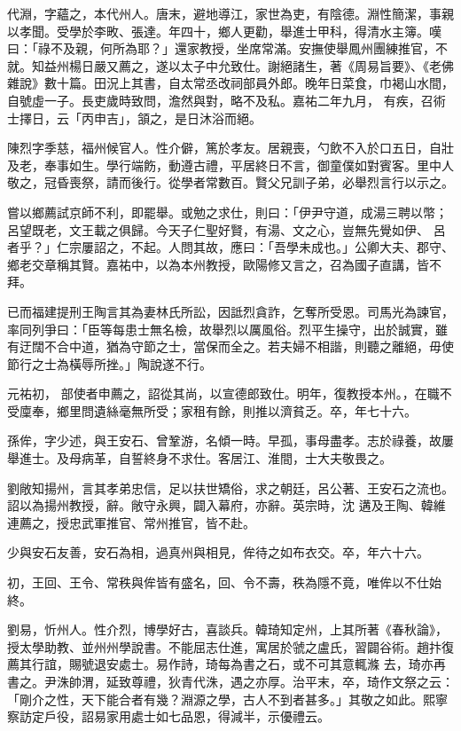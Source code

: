 \begin{pinyinscope}
 代淵，字蘊之，本代州人。唐末，避地導江，家世為吏，有陰德。淵性簡潔，事親以孝聞。受學於李畋、張達。年四十，鄉人更勸，舉進士甲科，得清水主簿。嘆曰：「祿不及親，何所為耶？」還家教授，坐席常滿。安撫使舉鳳州團練推官，不就。知益州楊日嚴又薦之，遂以太子中允致仕。謝絕諸生，著《周易旨要》、《老佛雜說》數十篇。田況上其書，自太常丞改祠部員外郎。晚年日菜食，巾褐山水間，自號虛一子。長吏歲時致問，澹然與對，略不及私。嘉祐二年九月，
 有疾，召術士擇日，云「丙申吉」，頷之，是日沐浴而絕。



 陳烈字季慈，福州候官人。性介僻，篤於孝友。居親喪，勺飲不入於口五日，自壯及老，奉事如生。學行端飭，動遵古禮，平居終日不言，御童僕如對賓客。里中人敬之，冠昏喪祭，請而後行。從學者常數百。賢父兄訓子弟，必舉烈言行以示之。



 嘗以鄉薦試京師不利，即罷舉。或勉之求仕，則曰：「伊尹守道，成湯三聘以幣；呂望既老，文王載之俱歸。今天子仁聖好賢，有湯、文之心，豈無先覺如伊、
 呂者乎？」仁宗屢詔之，不起。人問其故，應曰：「吾學未成也。」公卿大夫、郡守、鄉老交章稱其賢。嘉祐中，以為本州教授，歐陽修又言之，召為國子直講，皆不拜。



 已而福建提刑王陶言其為妻林氏所訟，因詆烈貪詐，乞奪所受恩。司馬光為諫官，率同列爭曰：「臣等每患士無名檢，故舉烈以厲風俗。烈平生操守，出於誠實，雖有迂闊不合中道，猶為守節之士，當保而全之。若夫婦不相諧，則聽之離絕，毋使節行之士為橫辱所挫。」陶說遂不行。



 元祐初，
 部使者申薦之，詔從其尚，以宣德郎致仕。明年，復教授本州。，在職不受廩奉，鄉里問遺絲毫無所受；家租有餘，則推以濟貧乏。卒，年七十六。



 孫侔，字少述，與王安石、曾鞏游，名傾一時。早孤，事母盡孝。志於祿養，故屢舉進士。及母病革，自誓終身不求仕。客居江、淮間，士大夫敬畏之。



 劉敞知揚州，言其孝弟忠信，足以扶世矯俗，求之朝廷，呂公著、王安石之流也。詔以為揚州教授，辭。敞守永興，闢入幕府，亦辭。英宗時，沈
 遘及王陶、韓維連薦之，授忠武軍推官、常州推官，皆不赴。



 少與安石友善，安石為相，過真州與相見，侔待之如布衣交。卒，年六十六。



 初，王回、王令、常秩與侔皆有盛名，回、令不壽，秩為隱不竟，唯侔以不仕始終。



 劉易，忻州人。性介烈，博學好古，喜談兵。韓琦知定州，上其所著《春秋論》，授太學助教、並州州學說書。不能屈志仕進，寓居於虢之盧氏，習闢谷術。趙抃復薦其行誼，賜號退安處士。易作詩，琦每為書之石，或不可其意輒滌
 去，琦亦再書之。尹洙帥渭，延致尊禮，狄青代洙，遇之亦厚。治平末，卒，琦作文祭之云：「剛介之性，天下能合者有幾？淵源之學，古人不到者甚多。」其敬之如此。熙寧察訪定戶役，詔易家用處士如七品恩，得減半，示優禮云。




\end{pinyinscope}
